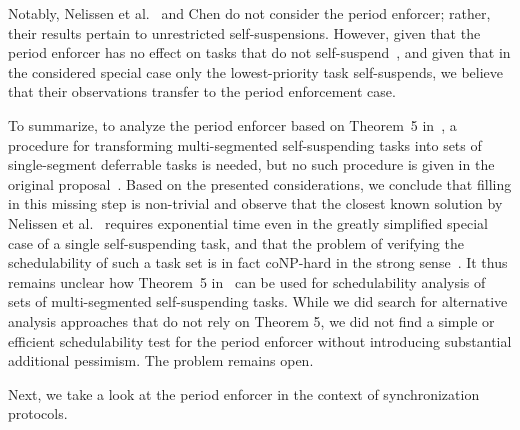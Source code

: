 Notably, Nelissen et al.~\cite{ecrts15nelissen} and Chen \cite{RTSS2016-suspension} do not consider the period enforcer; rather, their results pertain to unrestricted self-suspensions. However, given that the period enforcer has no effect on tasks that do not self-suspend~\cite{Raj:suspension1991}, and given that in the considered special case only the lowest-priority task self-suspends, we believe that their observations transfer to the period enforcement case.

To summarize, to analyze the period enforcer based on Theorem~5 in~\cite{Raj:suspension1991}, a procedure for transforming multi-segmented self-suspending tasks into sets of single-segment deferrable tasks is needed, but no such procedure is given in the original proposal~\cite{Raj:suspension1991}.
%
Based on the presented considerations, we conclude that filling in this missing step is non-trivial and observe that the closest known solution by Nelissen et al.~\cite{ecrts15nelissen} requires exponential time even in the greatly simplified special case of a single self-suspending task, and that the problem of verifying the schedulability of such a task set is in fact coNP-hard in the strong sense~\cite{RTSS2016-suspension}. It thus remains unclear how Theorem~5 in~\cite{Raj:suspension1991} can be used for schedulability analysis of sets of multi-segmented self-suspending tasks. 
While we did search for alternative analysis approaches that do not rely on Theorem 5, we did not find a simple or efficient schedulability test for the period enforcer without introducing substantial additional pessimism.  The problem remains open. 

Next, we take a look at the period enforcer in the context of synchronization protocols.




